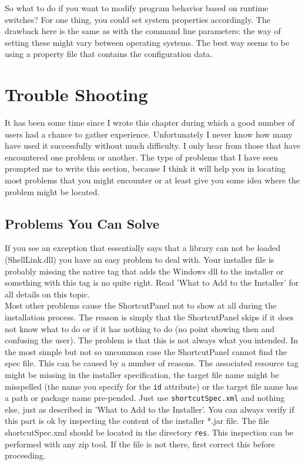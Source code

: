 So what to do if you want to modify program behavior based on runtime
switches? For one thing, you could set system properties accordingly.
The drawback here is the same as with the command line parameters: the
way of setting these might vary between operating systems. The best way
seems to be using a property file that contains the configuration
data.\\

\section{Trouble Shooting}

It has been some time since I wrote this chapter during which a good
number of users had a chance to gather experience. Unfortunately I
never know how many have used it successfully without much difficulty. I
only hear from those that have encountered one problem or another. The
type of problems that I have seen prompted me to write this section,
because I think it will help you in locating most problems that you might
encounter or at least give you some idea where the problem might be
located.\\

\subsection{Problems You Can Solve}

If you see an exception that essentially says that a library can not be
loaded (ShellLink.dll) you have an easy problem to deal with. Your
installer file is probably missing the native tag that adds the Windows
dll to the installer or something with this tag is no quite right. Read
'What to Add to the Installer' for all details on this topic.\\

Most other problems cause the ShortcutPanel not to show at all during
the installation process. The reason is simply that the ShortcutPanel
skips if it does not know what to do or if it has nothing to do (no
point showing then and confusing the user). The problem is that this is
not always what you intended. In the most simple but not so uncommon
case the ShortcutPanel cannot find the spec file. This can be caused by
a number of reasons. The associated resource tag might be missing in the
installer specification, the target file name might be misspelled (the
name you specify for the \texttt{id} attribute) or the target file name
has a path or package name pre-pended. Just use
\texttt{shortcutSpec.xml} and nothing else, just as described in 'What
to Add to the Installer'. You can always verify if this part is ok by
inspecting the content of the installer *.jar file. The file
shortcutSpec.xml should be located in the directory \texttt{res}. This
inspection can be performed with any zip tool. If the file is not there,
first correct this before proceeding.\\

